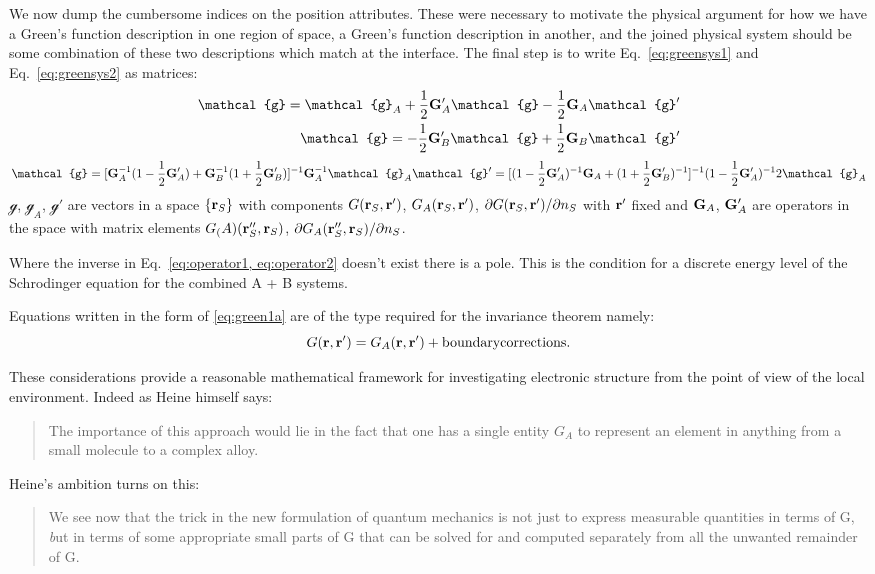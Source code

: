 \documentclass{article}
\def\G{{\bf G}}
\def\r{{\bf r}}
\def\g{\mathcal{g}}
\begin{document}
We now dump the cumbersome indices on the position attributes. These
were necessary to motivate the physical argument for how we have a Green's function
description in one region of space, a Green's function description in another, 
and the joined physical system should be some combination of these two descriptions
which match at the interface. The final step is to write Eq.~\ref{eq:greensys1} 
and Eq.~\ref{eq:greensys2} as matrices:
%
\begin{eqnarray}
\label{eq:operator1}
\g = \g_{A} + \frac{1}{2}\G'_{A}\g - \frac{1}{2}\G_{A}\g' \\
\g = -\frac{1}{2}\G'_{B}\g + \frac{1}{2}\G_{B}\g' \\
\end{eqnarray}
%
\begin{eqnarray}
\label{eq:operator2}
\g = [\G^{-1}_{A}(1-\frac{1}{2}\G'_{A}) + \G^{-1}_{B}(1+\frac{1}{2}\G'_{B})]^{-1} \G^{-1}_{A}\g_{A}
\g'= [(1-\frac{1}{2}\G'_{A})^{-1}\G_{A} + (1+\frac{1}{2}\G'_{B})^{-1}]^{-1}(1 - \frac{1}{2}\G'_{A})^{-1}2\g_{A}
\end{eqnarray}
%
$\g$, $\g_{A}$, $\g'$ are vectors in a space $\{\r_{S}\}$ with components $G(\r_{S},\r')$,
$G_{A}(\r_{S},\r')$, $\partial G(\r_{S},\r')/\partial n_{S}$ with $\r'$ fixed and
$\G_{A}$, $\G'_{A}$ are operators in the space with matrix elements
$G_(A)(\r''_{S}, \r_{S})$, $\partial G_{A}(\r''_{S}, \r_{S})/\partial n_{S}$.

Where the inverse in Eq.~\ref{eq:operator1, eq:operator2} 
doesn't exist there is a pole. This is the condition for a discrete energy level 
of the Schrodinger equation for the combined A + B systems. 

Equations written in the form of \ref{eq:green1a} are of the type required for the invariance theorem namely:
%
\begin{equation}
G(\r,\r') = G_{A}(\r,\r') + {\rm boundary corrections}.
\end{equation}
%

These considerations provide a reasonable mathematical framework for 
investigating electronic structure from the point of view of the local environment.
Indeed as Heine himself says: 

\begin{quote}
The importance of this approach would lie in the fact that
one has a single entity $G_{A}$ to represent an element in anything 
from a small molecule to a complex alloy.
\end{quote}

Heine's ambition turns on this:
\begin{quote}
We see now that the trick in the new formulation of quantum 
mechanics is not just to express measurable quantities in terms of 
G, {\emph but in terms of some appropriate small parts of G that can be solved 
for and computed separately from all the unwanted remainder of G.}
\end{quote}
\end{document}
